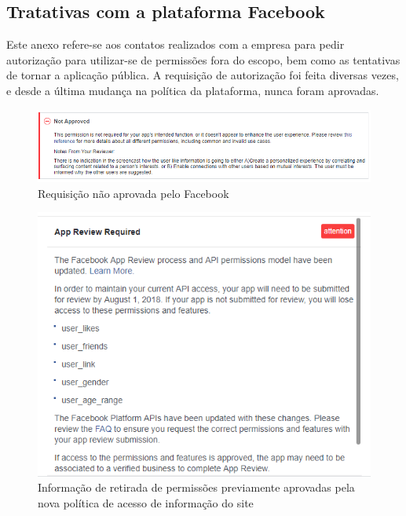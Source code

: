 \documentclass[
	12pt,				%
	oneside,			%
	a4paper,			%
	english,			%
	brazil				%
	]{abntex2ppgsi}
\begin{document}
\begin{anexosenv}

\chapter{Tratativas com a plataforma Facebook}
\label{anexoA}

Este anexo refere-se aos contatos realizados com a empresa para pedir autorização para utilizar-se de permissões fora do escopo, bem como as tentativas de tornar a aplicação pública. A requisição de autorização foi feita diversas vezes, e desde a última mudança na política da plataforma, nunca foram aprovadas.

\begin{figure}[H]
	\centering
	\caption{Requisição não aprovada pelo Facebook}
	\includegraphics[scale=1]{not_approved1.png}
\end{figure}

\begin{figure}[H]
	\centering
	\caption{Informação de retirada de permissões previamente aprovadas pela nova política de acesso de informação do site}
	\includegraphics[scale=1]{app_verification.png}
\end{figure}


\end{anexosenv}
\end{document}
